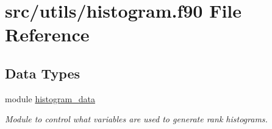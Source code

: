 \hypertarget{histogram_8f90}{\section{src/utils/histogram.f90 File Reference}
\label{histogram_8f90}
}
\subsection*{Data Types}
\begin{DoxyCompactItemize}
\item 
module \hyperlink{classhistogram__data}{histogram\-\_\-data}
\begin{DoxyCompactList}\small\item\em Module to control what variables are used to generate rank histograms. \end{DoxyCompactList}\end{DoxyCompactItemize}
